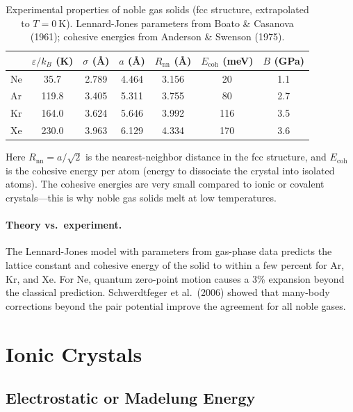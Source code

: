 \begin{table}[H]
\centering
\caption{Experimental properties of noble gas solids (fcc structure, extrapolated to $T = \SI{0}{\kelvin}$). Lennard-Jones parameters from Boato \& Casanova (1961); cohesive energies from Anderson \& Swenson (1975).}
\label{tab:noble_gas}
\begin{tabular}{@{}lSSSSSS@{}}
\toprule
 & {$\varepsilon/k_B$ (\si{\kelvin})} & {$\sigma$ (\AA{})} & {$a$ (\AA{})} & {$R_{\text{nn}}$ (\AA{})} & {$E_{\text{coh}}$ (\si{\milli\electronvolt})} & {$B$ (\si{\giga\pascal})} \\
\midrule
Ne & 35.7  & 2.789 & 4.464 & 3.156 & 20   & 1.1 \\
Ar & 119.8 & 3.405 & 5.311 & 3.755 & 80   & 2.7 \\
Kr & 164.0 & 3.624 & 5.646 & 3.992 & 116  & 3.5 \\
Xe & 230.0 & 3.963 & 6.129 & 4.334 & 170  & 3.6 \\
\bottomrule
\end{tabular}
\end{table}

Here $R_{\text{nn}} = a/\sqrt{2}$ is the nearest-neighbor distance in the fcc structure, and $E_{\text{coh}}$ is the cohesive energy per atom (energy to dissociate the crystal into isolated atoms). The cohesive energies are very small compared to ionic or covalent crystals---this is why noble gas solids melt at low temperatures.

\paragraph{Theory vs.\ experiment.} The Lennard-Jones model with parameters from gas-phase data predicts the lattice constant and cohesive energy of the solid to within a few percent for Ar, Kr, and Xe. For Ne, quantum zero-point motion causes a 3\% expansion beyond the classical prediction. Schwerdtfeger et al.\ (2006) showed that many-body corrections beyond the pair potential improve the agreement for all noble gases.


\section{Ionic Crystals}

\subsection{Electrostatic or Madelung Energy}

